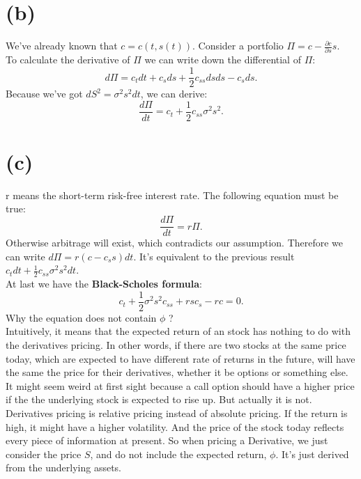 \documentclass[12pt,a4paper]{paper}
\begin{document}
\section{(b)}
\indent We've already known that $c = c(t, s(t))$. Consider a portfolio $\Pi=c-\frac{\partial c}{\partial s}s$.\\
\indent To calculate the derivative of $\Pi$ we can write down the differential of $\Pi$:
\begin{equation}
d\Pi = c_t dt + c_s ds + \frac{1}{2}c_{ss} ds ds - c_s ds.
\end{equation}
\indent Because we've got $dS^2={\sigma}^{2} s^{2}dt$, we can derive:
\begin{equation}
\frac{d\Pi}{dt}= c_t + \frac{1}{2} c_{ss} \sigma^2 s^2.
\end{equation}

\section{(c)}
\indent r means the short-term risk-free interest rate. The following equation must be true:
\begin{equation}
\frac{d\Pi}{dt}=r\Pi.
\end{equation}
\indent Otherwise arbitrage will exist, which contradicts our assumption. Therefore we can write $d\Pi = r(c - c_s s)dt$. It's equivalent to the previous result $c_t dt + \frac{1}{2} c_{ss} \sigma^2 s^2 dt$.\\
\indent At last we have the \textbf{Black-Scholes formula}:
\begin{equation}
c_t + \frac{1}{2}\sigma^2 s^2 c_{ss} + rsc_s - rc = 0.
\end{equation}
\indent Why the equation does not contain $\phi$ ? \\
\indent Intuitively, it means that the expected return of an stock has nothing to do with the derivatives pricing. In other words, if there are two stocks at the same price today, which are expected to have different rate of returns in the future, will have the same the price for their derivatives, whether it be options or something else. It might seem weird at first sight because a call option should have a higher price if the the underlying stock is expected to rise up. But actually it is not. Derivatives pricing is relative pricing instead of absolute pricing. If the return is high, it might have a higher volatility. And the price of the stock today reflects every piece of information at present. So when pricing a Derivative, we just consider the price $S$, and do not include the expected return, $\phi$. It's just derived from the underlying assets.
\end{document}
